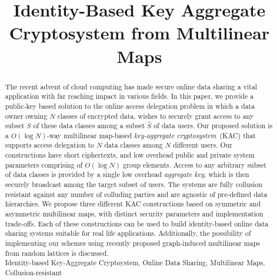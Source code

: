 \documentclass{class/llncs}
\title{Identity-Based Key Aggregate Cryptosystem from Multilinear Maps}
\begin{document}
% 
\author{}
\institute{}

\maketitle
{}


\begin{abstract}

The recent advent of cloud computing has made secure online data sharing a vital application with far reaching impact in various fields. In this paper, we provide a public-key based solution to the online access delegation problem in which a data owner owning $N$ classes of encrypted data, wishes to securely grant access to any subset $S$ of these data classes among a subset $\hat{S}$ of data users. Our proposed solution is a $O(\log N)$-way multilinear map-based \emph{key-aggregate cryptosystem}~(KAC) that supports access delegation to $N$ data classes among $N$ different users. Our constructions have short ciphertexts, and low overhead public and private system parameters comprising of $O(\log N)$ group elements. Access to any arbitrary subset of data classes is provided by a single low overhead \emph{aggregate key}, which is then securely broadcast among the target subset of users. The systems are fully collusion resistant against any number of colluding parties and are agnostic of pre-defined data hierarchies. We propose three different KAC constructions based on symmetric and asymmetric multilinear maps, with distinct security parameters and implementation trade-offs. Each of these constructions can be used to build identity-based online data sharing systems suitable for real life applications. Additionally, the possibility of implementing our schemes using recently proposed graph-induced multilinear maps from random lattices is discussed.\\  

 Identity-based Key-Aggregate Cryptoystem, Online Data Sharing, Multilinear Maps, Collusion-resistant
\end{abstract}












\newpage

\end{document}
